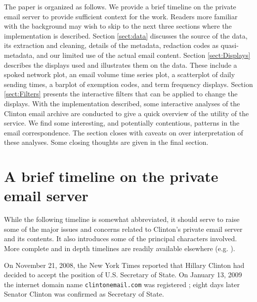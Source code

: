 \documentclass[journal]{vgtc}                %
\begin{document}
The paper is organized as follows.  We provide a brief timeline on the private email server to provide sufficient context for the work.  Readers more familiar with the background may wish to skip to the next three sections where the implementation is described.  Section \ref{sect:data} discusses the source of the data, its extraction and cleaning,  details of the metadata,  redaction codes as quasi-metadata,  and our limited use of the actual email content. 
Section \ref{sect:Displays} describes the displays used and illustrates them on the data. These include a spoked network plot, an email volume time series plot, a scatterplot of daily sending times, a barplot of exemption codes, and term frequency displays. Section \ref{sect:Filters} presents the interactive filters that can be applied to change the displays.  With the implementation described, some interactive analyses of the Clinton email archive are conducted to give a quick overview of the utility of the service.  We find some interesting, and potentially contentious, patterns in the email correspondence.  The section closes with  caveats on over interpretation of these analyses.  Some closing thoughts are given in the final section.

%
\section{A brief timeline on the private email server}
\label{sect:Timeline}
While the following timeline is somewhat abbreviated, it should serve to raise some of the major issues and concerns related to Clinton's private email server and its contents.  It also introduces some of the principal characters involved.  More complete and in depth timelines are readily available elsewhere (e.g. \cite{attkissonTimeline, thompsonTimeline, WashPostTimeline, clintonWikipedia, TimeMagEverything}).

On November 21, 2008, the New York Times reported that Hillary Clinton had decided to accept the position of U.S. Secretary of State.  On January 13, 2009 the internet domain name \texttt{clintonemail.com} was registered \cite{whoisClintonserver}; eight days later Senator Clinton was confirmed as Secretary of State.  
\end{document}
